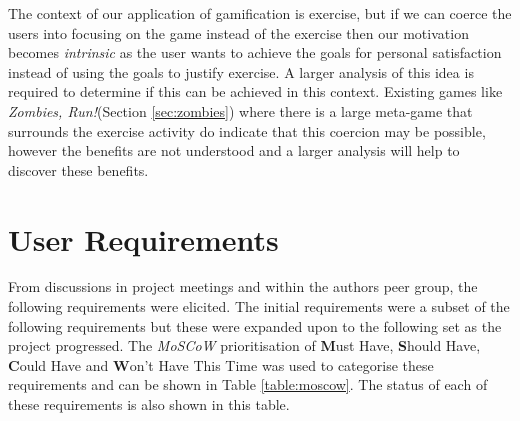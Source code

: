 The context of our application of gamification is exercise, but if we
can coerce the users into focusing on the game instead of the exercise
then our motivation becomes \emph{intrinsic} as the user wants to
achieve the goals for personal satisfaction instead of using the goals
to justify exercise. A larger analysis of this idea is required to
determine if this can be achieved in this context. Existing games like
\emph{Zombies, Run!}(Section \ref{sec:zombies}) where there is a large
meta-game that surrounds the exercise activity do indicate that this
coercion may be possible, however the benefits are not understood and
a larger analysis will help to discover these benefits. 

\section{User Requirements}
From discussions in project meetings and within the authors peer
group, the following requirements were elicited. The initial
requirements were a subset of the following requirements but these
were expanded upon to the following set as the project progressed. The
\emph{MoSCoW} prioritisation \cite{moscow} of \textbf{M}ust Have,
\textbf{S}hould Have, \textbf{C}ould Have and \textbf{W}on't Have This
Time was used to categorise these requirements and can be shown in
Table \ref{table:moscow}. The status of each of these requirements is
also shown in this table.

